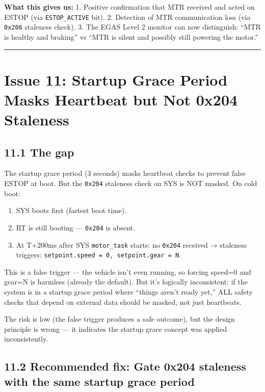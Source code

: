 \documentclass[12pt,a4paper,oneside]{report}
\providecommand{\tightlist}{\setlength{\itemsep}{0pt}\setlength{\parskip}{0pt}}
\begin{document}
\textbf{What this gives us:} 1. Positive confirmation that MTR received and
acted on ESTOP (via \texttt{ESTOP\_ACTIVE} bit). 2. Detection of MTR
communication loss (via \texttt{0x206} staleness check). 3. The EGAS Level 2
monitor can now distinguish: ``MTR is healthy and braking'' vs ``MTR is silent
and possibly still powering the motor.''

\begin{center}\rule{0.5\linewidth}{0.5pt}\end{center}

\section{Issue 11: Startup Grace Period Masks Heartbeat but Not 0x204
Staleness}\label{issue-11-startup-grace-period-masks-heartbeat-but-not-0x204-staleness}

\subsection{11.1 The gap}\label{the-gap-4}

The startup grace period (3 seconds) masks heartbeat checks to prevent false
ESTOP at boot. But the \texttt{0x204} staleness check on SYS is NOT masked. On
cold boot:

\begin{enumerate}
\def\labelenumi{\arabic{enumi}.}
\tightlist
\item
  SYS boots first (fastest boot time).
\item
  RT is still booting --- \texttt{0x204} is absent.
\item
  At T+200ms after SYS \texttt{motor\_task} starts: no \texttt{0x204} received →
  staleness triggers: \texttt{setpoint.speed\ =\ 0,\ setpoint.gear\ =\ N}.
\end{enumerate}

This is a false trigger --- the vehicle isn't even running, so forcing speed=0
and gear=N is harmless (already the default). But it's logically inconsistent:
if the system is in a startup grace period where ``things aren't ready yet,''
ALL safety checks that depend on external data should be masked, not just
heartbeats.

The risk is low (the false trigger produces a safe outcome), but the design
principle is wrong --- it indicates the startup grace concept was applied
inconsistently.

\subsection{11.2 Recommended fix: Gate 0x204 staleness with the same startup
grace
period}\label{recommended-fix-gate-0x204-staleness-with-the-same-startup-grace-period}
\end{document}
